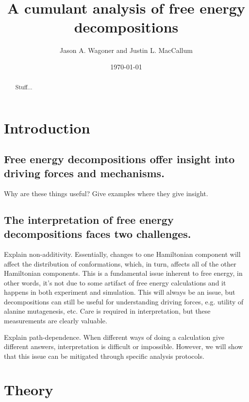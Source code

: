 \documentclass{article}
\begin{document}
\title{A cumulant analysis of free energy decompositions}
\author{Jason A. Wagoner and Justin L. MacCallum}

\date{ \today}

\maketitle

\begin{abstract}
Stuff...
\end{abstract}

\section{Introduction}

\subsection{Free energy decompositions offer insight into driving forces and mechanisms.}

Why are these things useful? Give examples where they give insight.




\subsection{The interpretation of free energy decompositions faces two challenges.}

Explain non-additivity. Essentially, changes to one Hamiltonian component will affect the distribution of conformations, which, in turn, affects all of the other Hamiltonian components. This is a fundamental issue inherent to free energy, in other words, it's not due to some artifact of free energy calculations and it happens in both experiment and simulation. This will always be an issue, but decompositions can still be useful for understanding driving forces, e.g. utility of alanine mutagenesis, etc. Care is required in interpretation, but these measurements are clearly valuable.

Explain path-dependence. When different ways of doing a calculation give different answers, interpretation is difficult or impossible. However, we will show that this issue can be mitigated through specific analysis protocols.




\section{Theory}
\end{document}
